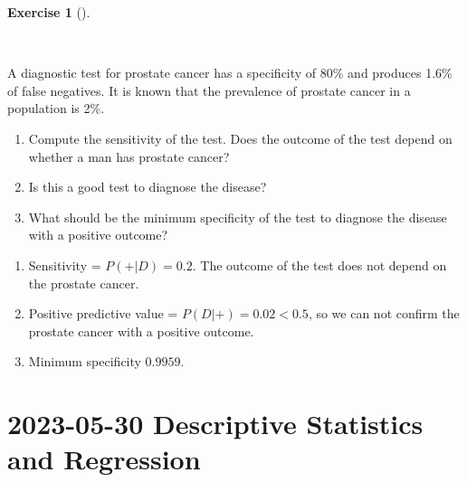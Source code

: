 \documentclass[
  a4paper,
]{scrreport}
\theoremstyle{definition}
\newtheorem{exercise}{Exercise}[chapter]
\theoremstyle{remark}
\begin{document}
\begin{exercise}[]\protect\hypertarget{exr-4}{}\label{exr-4}

~

A diagnostic test for prostate cancer has a specificity of 80\% and
produces 1.6\% of false negatives. It is known that the prevalence of
prostate cancer in a population is 2\%.

\begin{enumerate}
\def\labelenumi{\alph{enumi}.}
\item
  Compute the sensitivity of the test. Does the outcome of the test
  depend on whether a man has prostate cancer?
\item
  Is this a good test to diagnose the disease?
\item
  What should be the minimum specificity of the test to diagnose the
  disease with a positive outcome?
\end{enumerate}

\begin{tcolorbox}[enhanced jigsaw, colback=white, title=\textcolor{quarto-callout-tip-color}{\faLightbulb}\hspace{0.5em}{Solution}, arc=.35mm, colbacktitle=quarto-callout-tip-color!10!white, breakable, leftrule=.75mm, colframe=quarto-callout-tip-color-frame, opacitybacktitle=0.6, left=2mm, toptitle=1mm, bottomtitle=1mm, titlerule=0mm, rightrule=.15mm, bottomrule=.15mm, toprule=.15mm, opacityback=0, coltitle=black]

\begin{enumerate}
\def\labelenumi{\alph{enumi}.}
\item
  Sensitivity = \(P(+|D) = 0.2\). The outcome of the test does not
  depend on the prostate cancer.
\item
  Positive predictive value = \(P(D|+) = 0.02 < 0.5\), so we can not
  confirm the prostate cancer with a positive outcome.
\item
  Minimum specificity \(0.9959\).
\end{enumerate}

\end{tcolorbox}

\end{exercise}


\hypertarget{descriptive-statistics-and-regression-3}{%
\chapter{\texorpdfstring{2023-05-30 Descriptive Statistics and
Regression}{2023-05-30  Descriptive Statistics and Regression}}\label{descriptive-statistics-and-regression-3}}
\end{document}

